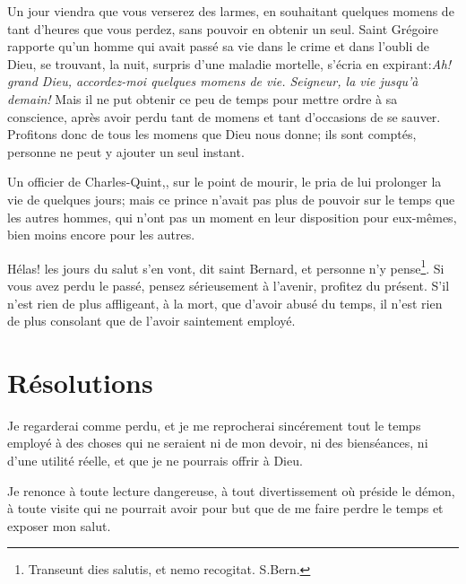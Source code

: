 \documentclass[instructions.tex]{subfiles}
\begin{document}
\secundo Un jour viendra que vous verserez des larmes, en souhaitant quelques momens de tant d'heures que vous perdez, sans pouvoir en obtenir un seul. Saint Grégoire rapporte qu'un homme qui avait passé sa vie dans le crime et dans l'oubli de Dieu, se trouvant, la nuit, surpris d'une maladie mortelle, s'écria en expirant:\textit{Ah! grand Dieu, accordez-moi quelques momens de vie. Seigneur, la vie jusqu'à demain!} Mais il ne put obtenir ce peu de temps pour mettre ordre à sa conscience, après avoir perdu tant de momens et tant d'occasions de se sauver. Profitons donc de tous les momens que Dieu nous donne; ils sont comptés, personne ne peut y ajouter un seul instant. 

Un officier de Charles-Quint,, sur le point de mourir, le pria de lui prolonger la vie de quelques jours; mais ce prince n'avait pas plus de pouvoir sur le temps que les autres hommes, qui n'ont pas un moment en leur disposition pour eux-mêmes, bien moins encore pour les autres.

Hélas! les jours du salut s'en vont, dit saint Bernard, et personne n'y pense\footnote{Transeunt dies salutis, et nemo recogitat. S.Bern.}. Si vous avez perdu le passé, pensez sérieusement à l'avenir, profitez du présent. S'il n'est rien de plus affligeant, à la mort, que d'avoir abusé du temps, il n'est rien de plus consolant que de l'avoir saintement employé.


\section{Résolutions}

\primo Je regarderai comme perdu, et je me reprocherai sincérement tout le temps employé à des choses qui ne seraient ni de mon devoir, ni des bienséances, ni d'une utilité réelle, et que je ne pourrais offrir à Dieu.

\secundo Je renonce à toute lecture dangereuse, à tout divertissement où préside le démon, à toute visite qui ne pourrait avoir pour but que de me faire perdre le temps et exposer mon salut. 

\end{document}
